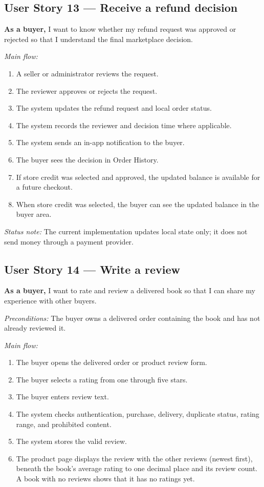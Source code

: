 \documentclass[11pt]{scrreprt}
\begin{document}
\subsection{User Story 13 --- Receive a refund decision}
\textbf{As a buyer,} I want to know whether my refund request was approved or
rejected so that I understand the final marketplace decision.

\textit{Main flow:}
\begin{enumerate}
\item A seller or administrator reviews the request.
\item The reviewer approves or rejects the request.
\item The system updates the refund request and local order status.
\item The system records the reviewer and decision time where applicable.
\item The system sends an in-app notification to the buyer.
\item The buyer sees the decision in Order History.
\item If store credit was selected and approved, the updated balance is
available for a future checkout.
\item When store credit was selected, the buyer can see the updated balance in
the buyer area.
\end{enumerate}

\textit{Status note:} The current implementation updates local state only; it
does not send money through a payment provider.

\subsection{User Story 14 --- Write a review}
\textbf{As a buyer,} I want to rate and review a delivered book so that I can
share my experience with other buyers.

\textit{Preconditions:} The buyer owns a delivered order containing the book
and has not already reviewed it.

\textit{Main flow:}
\begin{enumerate}
\item The buyer opens the delivered order or product review form.
\item The buyer selects a rating from one through five stars.
\item The buyer enters review text.
\item The system checks authentication, purchase, delivery, duplicate status,
rating range, and prohibited content.
\item The system stores the valid review.
\item The product page displays the review with the other reviews (newest
first), beneath the book's average rating to one decimal place and its review
count. A book with no reviews shows that it has no ratings yet.
\end{enumerate}
\end{document}
